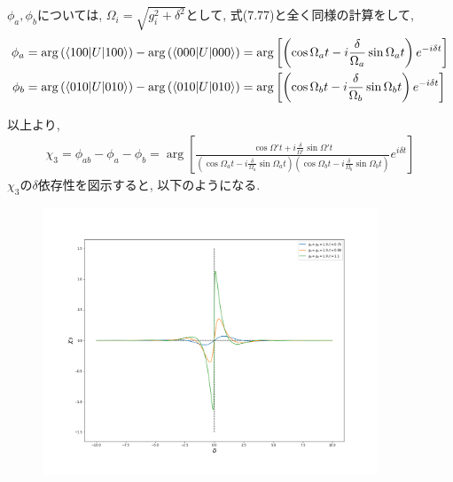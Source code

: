 \begin{ex}
    $\phi_a, \phi_b$については, $\Omega_i = \sqrt{g_i^2 + \delta^2}$として, 式(7.77)と全く同様の計算をして,
    \begin{align*}
        \phi_a
         & = \arg\left( \braket{100|U|100}\right) - \arg\left( \braket{000|U|000}\right)
        =  \arg\left[ \left(\cos\Omega_a t - i \frac{\delta}{\Omega_a} \sin\Omega_a t\right) e^{- i \delta t} \right]
        \\
        \phi_b
         & = \arg\left( \braket{010|U|010}\right) - \arg\left( \braket{010|U|010}\right)
        =  \arg\left[
        \left(\cos\Omega_b t - i \frac{\delta}{\Omega_b} \sin\Omega_b t \right)e^{- i \delta t} \right]
    \end{align*}
    \par
    以上より,
    \begin{align*}
        \chi_3 = \phi_{ab} - \phi_a - \phi_b
        =
        \arg\left[
            \frac{\cos\Omega' t + i \frac{\delta}{\Omega'} \sin\Omega't }
            {\left(\cos\Omega_a t - i \frac{\delta}{\Omega_a} \sin\Omega_a t\right)
                \left(\cos\Omega_b t - i \frac{\delta}{\Omega_b} \sin\Omega_b t \right)}
            e^{i \delta t}
            \right]
    \end{align*}
    $\chi_3$の$\delta$依存性を図示すると, 以下のようになる.
    \begin{figure}[H]
        \begin{center}
            \includegraphics[width = 100mm]{../fig/ex7_21.png}
        \end{center}
    \end{figure}
\end{ex}

